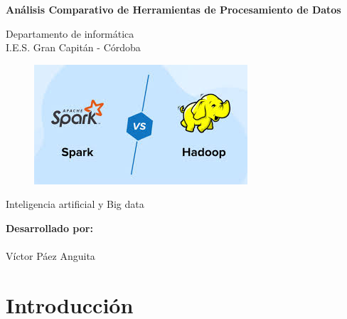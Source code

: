 \documentclass[12pt]{article}
\begin{document}
\begin{titlepage}
    \begin{center}
      \Large \bfseries{}
    \end{center}
    \vspace{0.1cm}
    \begin{center}
      \Large \bfseries{}
    \end{center}
    \vspace{0.1cm}
    \begin{center}
     \Large \bfseries{Análisis Comparativo de Herramientas de Procesamiento de Datos}
    \end{center}
    \vspace{0.0001cm}
    \begin{center}
        Departamento de informática \\ I.E.S. Gran Capitán - Córdoba
    \end{center}
        \vspace{2 cm}
\begin{figure}[h!]
    \centering
    \includegraphics[width=.6\textwidth]{portada.png}
    \label{fig:my_label}
\end{figure}
    \vspace{0.2 cm}
    \begin{center}
        Inteligencia artificial y Big data \\ \currenttime 
    \end{center}
    \vspace{4 cm}
\null\hfill \textbf{Desarrollado por:}
\\
\\
\null\hfill Víctor Páez Anguita
\clearpage
\end{titlepage}

\tableofcontents
\clearpage

\section{Introducción}
\end{document}
